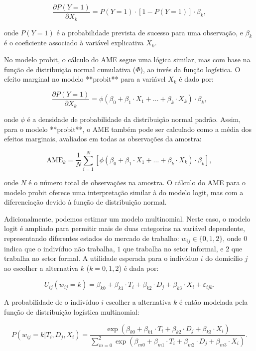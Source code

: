 \documentclass[12pt]{article}
\theoremstyle{break}
\begin{document}
\[
\frac{\partial P(Y = 1)}{\partial X_k} = P(Y = 1) \cdot \left[1 - P(Y = 1)\right] \cdot \beta_k,
\]

onde \(P(Y = 1)\) é a probabilidade prevista de sucesso para uma observação, e \(\beta_k\) é o coeficiente associado à variável explicativa \(X_k\).

No modelo probit, o cálculo do AME segue uma lógica similar, mas com base na função de distribuição normal cumulativa (\(\Phi\)), ao invés da função logística. O efeito marginal no modelo **probit** para a variável \(X_k\) é dado por:

\[
\frac{\partial P(Y = 1)}{\partial X_k} = \phi\left( \beta_0 + \beta_1 \cdot X_1 + \dots + \beta_k \cdot X_k \right) \cdot \beta_k,
\]

onde \(\phi\) é a densidade de probabilidade da distribuição normal padrão. Assim, para o modelo **probit**, o AME também pode ser calculado como a média dos efeitos marginais, avaliados em todas as observações da amostra:

\[
\text{AME}_k = \frac{1}{N} \sum_{i=1}^N \left[ \phi\left( \beta_0 + \beta_1 \cdot X_1 + \dots + \beta_k \cdot X_k \right) \cdot \beta_k \right],
\]

onde \(N\) é o número total de observações na amostra. O cálculo do AME para o modelo probit oferece uma interpretação similar à do modelo logit, mas com a diferenciação devido à função de distribuição normal.

Adicionalmente, podemos estimar um modelo multinomial. Neste caso, o modelo logit é ampliado para permitir mais de duas categorias na variável dependente, representando diferentes estados do mercado de trabalho: \(w_{ij} \in \{0, 1, 2\}\), onde \(0\) indica que o indivíduo não trabalha, \(1\) que trabalha no setor informal, e \(2\) que trabalha no setor formal. A utilidade esperada para o indivíduo \(i\) do domicílio \(j\) ao escolher a alternativa \(k\) (\(k = 0, 1, 2\)) é dada por:

\[
U_{ij}(w_{ij} = k) = \beta_{k0} + \beta_{k1} \cdot T_i + \beta_{k2} \cdot D_j + \beta_{k3} \cdot X_i + \varepsilon_{ijk}.
\]

A probabilidade de o indivíduo \(i\) escolher a alternativa \(k\) é então modelada pela função de distribuição logística multinomial:

\[
P(w_{ij} = k | T_i, D_j, X_i) = \frac{\exp\left( \beta_{k0} + \beta_{k1} \cdot T_i + \beta_{k2} \cdot D_j + \beta_{k3} \cdot X_i \right)}{\sum_{m=0}^2 \exp\left( \beta_{m0} + \beta_{m1} \cdot T_i + \beta_{m2} \cdot D_j + \beta_{m3} \cdot X_i \right)}.
\]
\end{document}
